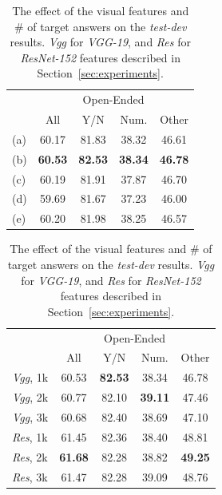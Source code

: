 \documentclass{article}
\begin{document}
\begin{table}[t!]
\centering
\begin{minipage}{.45\textwidth}
  \caption{The results of alternative models (a)-(e) on the \textit{test-dev}.}
  \label{tab:alt_results}
  \centering
  \begin{tabular}{lcccc}
  \toprule
  & \multicolumn{4}{c}{Open-Ended}\\
  \cmidrule{2-5}
   & All & Y/N & Num. & Other \\
  \midrule
  (a) & 60.17 & 81.83 & 38.32 & 46.61 \\
  (b) & \textbf{60.53} & \textbf{82.53} & \textbf{38.34} & \textbf{46.78}  \\
  (c) & 60.19 & 81.91 & 37.87 & 46.70 \\
  (d) & 59.69 & 81.67 & 37.23 & 46.00 \\
  (e) & 60.20 & 81.98 & 38.25 & 46.57 \\
  \bottomrule
  \end{tabular}
\end{minipage}\hspace{10px}
\begin{minipage}{.49\textwidth}
  \caption{The effect of the visual features and \# of target answers on the \textit{test-dev} results. \textit{Vgg} for \textit{VGG-19}, and \textit{Res} for \textit{ResNet-152} features described in Section~\ref{sec:experiments}.}
  \label{tab:feat_results}
  \centering
  \begin{tabular}{lcccc}
  \toprule
  & \multicolumn{4}{c}{Open-Ended}\\
  \cmidrule{2-5}
   & All & Y/N & Num. & Other \\
  \midrule
  \textit{Vgg}, 1k & 60.53 & \textbf{82.53} & 38.34 & 46.78 \\
  \textit{Vgg}, 2k & 60.77 & 82.10 & \textbf{39.11} & 47.46 \\
  \textit{Vgg}, 3k & 60.68 & 82.40 & 38.69 & 47.10 \\
  \textit{Res}, 1k & 61.45 & 82.36 & 38.40 & 48.81 \\
  \textit{Res}, 2k & \textbf{61.68} & 82.28 & 38.82 & \textbf{49.25} \\
  \textit{Res}, 3k & 61.47 & 82.28 & 39.09 & 48.76 \\
  \bottomrule
  \end{tabular}
\end{minipage}
\end{table}
\end{document}
